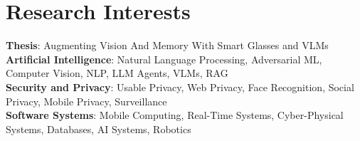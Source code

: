 \section{Research Interests}
 \begin{itemize}[leftmargin=0.5cm, label={}]
    \small{\item{
     \textbf{Thesis}{: Augmenting Vision And Memory With Smart Glasses and VLMs} \\
     \textbf{Artificial Intelligence}{: Natural Language Processing, Adversarial ML, Computer Vision, NLP, LLM Agents, VLMs, RAG} \\
     \textbf{Security and Privacy}{: Usable Privacy, Web Privacy, Face Recognition, Social Privacy, Mobile Privacy, Surveillance} \\
     \textbf{Software Systems}{: Mobile Computing, Real-Time Systems, Cyber-Physical Systems, Databases, AI Systems, Robotics} \\
    }}
 \end{itemize}
